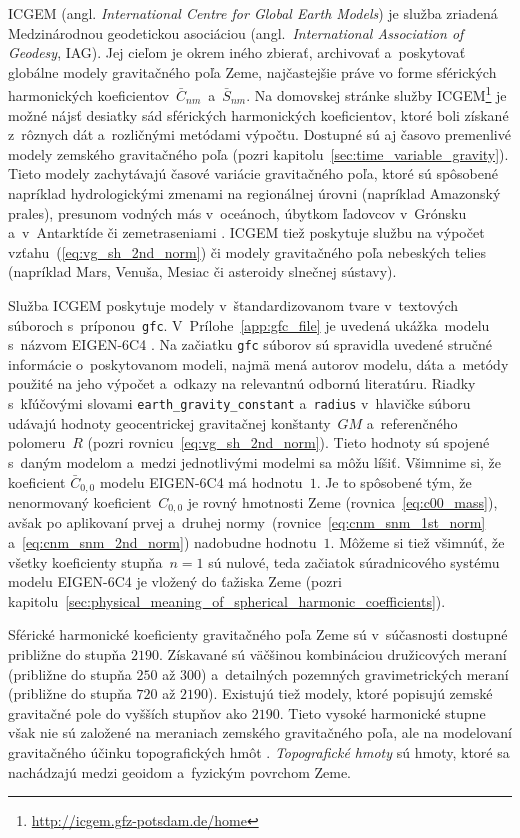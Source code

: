 \documentclass[a4paper, 12pt]{book}
\begin{document}
ICGEM (angl. \emph{International Centre for Global Earth Models}) je služba 
zriadená Medzinárodnou geodetickou asociáciou (angl.~\emph{International 
Association of Geodesy}, IAG).  Jej cieľom je okrem iného zbierať, archivovať 
a~poskytovať globálne modely gravitačného poľa Zeme, najčastejšie práve vo 
forme sférických harmonických koeficientov~$\bar{C}_{nm}$~a~$\bar{S}_{nm}$.  Na 
domovskej stránke služby 
ICGEM\footnote{\label{fn:icgem_link}\url{http://icgem.gfz-potsdam.de/home}} je 
možné nájsť desiatky sád sférických harmonických koeficientov, ktoré boli 
získané z~rôznych dát a~rozličnými metódami výpočtu.  Dostupné sú aj časovo 
premenlivé modely zemského gravitačného poľa (pozri 
kapitolu~\ref{sec:time_variable_gravity}).  Tieto modely zachytávajú časové 
variácie gravitačného poľa, ktoré sú spôsobené napríklad hydrologickými zmenami 
na regionálnej úrovni (napríklad Amazonský prales), presunom vodných más 
v~oceánoch, úbytkom ľadovcov v~Grónsku a~v~Antarktíde či zemetraseniami 
\parencite{Wahr2007}.  ICGEM tiež poskytuje službu na výpočet 
vzťahu~(\ref{eq:vg_sh_2nd_norm}) či modely gravitačného poľa nebeských telies 
(napríklad Mars, Venuša, Mesiac či asteroidy slnečnej sústavy).

Služba ICGEM poskytuje modely v~štandardizovanom tvare v~textových súboroch 
s~príponou~\texttt{gfc}.  V~Prílohe~\ref{app:gfc_file} je uvedená ukážka~modelu 
s~názvom EIGEN-6C4 \parencite{EIGEN-6C4}.  Na začiatku \texttt{gfc} súborov sú 
spravidla uvedené stručné informácie o~poskytovanom modeli, najmä mená autorov 
modelu, dáta a~metódy použité na jeho výpočet a~odkazy na relevantnú odbornú 
literatúru.  Riadky s~kľúčovými slovami \texttt{earth\_gravity\_constant} 
a~\texttt{radius} v~hlavičke súboru udávajú hodnoty geocentrickej gravitačnej 
konštanty~$GM$ a~referenčného polomeru~$R$ (pozri 
rovnicu~\ref{eq:vg_sh_2nd_norm}).  Tieto hodnoty sú spojené s~daným modelom 
a~medzi jednotlivými modelmi sa môžu líšiť.  Všimnime si, že koeficient 
$\bar{C}_{0,0}$ modelu EIGEN-6C4 má hodnotu~$1$.  Je to spôsobené tým, že 
nenormovaný koeficient~$C_{0,0}$ je rovný hmotnosti Zeme 
(rovnica~\ref{eq:c00_mass}), avšak po aplikovaní prvej a~druhej 
normy~(rovnice~\ref{eq:cnm_snm_1st_norm} a~\ref{eq:cnm_snm_2nd_norm}) nadobudne 
hodnotu~$1$.  Môžeme si tiež všimnúť, že všetky koeficienty stupňa~$n = 1$ sú 
nulové, teda začiatok súradnicového systému modelu EIGEN-6C4 je vložený do 
ťažiska Zeme (pozri 
kapitolu~\ref{sec:physical_meaning_of_spherical_harmonic_coefficients}).

Sférické harmonické koeficienty gravitačného poľa Zeme sú v~súčasnosti dostupné
približne do stupňa $2190$.  Získavané sú väčšinou kombináciou družicových
meraní (približne do stupňa $250$ až $300$) a~detailných pozemných
gravimetrických meraní (približne do stupňa $720$ až $2190$).  Existujú tiež 
modely, ktoré popisujú zemské gravitačné pole do vyšších stupňov ako $2190$.  
Tieto vysoké harmonické stupne však nie sú založené na meraniach zemského 
gravitačného poľa, ale na modelovaní gravitačného účinku topografických hmôt 
\parencite[napríklad][]{Ince2020}.  \emph{Topografické 
hmoty}\label{def:topographic_masses} sú hmoty, ktoré sa nachádzajú medzi 
geoidom a~fyzickým povrchom Zeme.
\end{document}
